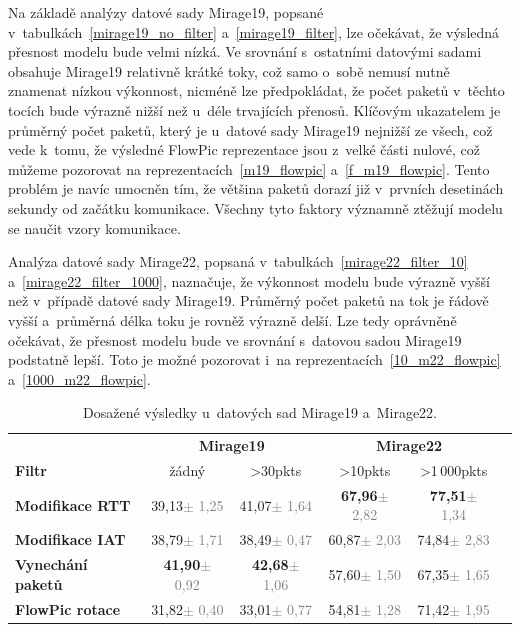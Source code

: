 Na základě analýzy datové sady Mirage19, popsané v~tabulkách~\ref{mirage19_no_filter} a~\ref{mirage19_filter}, lze očekávat, že výsledná přesnost modelu bude velmi nízká. Ve srovnání s~ostatními datovými sadami obsahuje Mirage19 relativně krátké toky, což samo o~sobě nemusí nutně znamenat nízkou výkonnost, nicméně lze předpokládat, že počet paketů v~těchto tocích bude výrazně nižší než u~déle trvajících přenosů. Klíčovým ukazatelem je průměrný počet paketů, který je u~datové sady Mirage19 nejnižší ze všech, což vede k~tomu, že výsledné FlowPic reprezentace jsou z~velké části nulové, což můžeme pozorovat na reprezentacích~\ref{m19_flowpic} a~\ref{f_m19_flowpic}. Tento problém je navíc umocněn tím, že většina paketů dorazí již v~prvních desetinách sekundy od začátku komunikace. Všechny tyto faktory významně ztěžují modelu se naučit vzory komunikace.

Analýza datové sady Mirage22, popsaná v~tabulkách~\ref{mirage22_filter_10} a~\ref{mirage22_filter_1000}, naznačuje, že výkonnost modelu bude výrazně vyšší než v~případě datové sady Mirage19. Průměrný počet paketů na tok je řádově vyšší a~průměrná délka toku je rovněž výrazně delší. Lze tedy oprávněně očekávat, že přesnost modelu bude ve srovnání s~datovou sadou Mirage19 podstatně lepší. Toto je možné pozorovat i~na reprezentacích~\ref{10_m22_flowpic} a~\ref{1000_m22_flowpic}.

\begin{table}[H]
    \centering
        \begin{tabular}{l c c c c c}
            \toprule
              & \multicolumn{2}{c}{\textbf{Mirage19}} & \multicolumn{2}{c}{\textbf{Mirage22}} \\
              \cmidrule(lr){2-3} \cmidrule(lr){4-5}
             \textbf{Filtr} & žádný & >30pkts & >10pkts & >1\,000pkts \\
            \midrule
            \textbf{Modifikace RTT} & 39,13{\tiny\textcolor{gray}{$\pm$ 1,25}} & 41,07{\tiny\textcolor{gray}{$\pm$ 1,64}} & \textbf{67,96}{\tiny\textcolor{gray}    {$\pm$ 2,82}} & \textbf{77,51}{\tiny\textcolor{gray}{$\pm$ 1,34}}\\
            \textbf{Modifikace IAT} & 38,79{\tiny\textcolor{gray}{$\pm$ 1,71}} & 38,49{\tiny\textcolor{gray}{$\pm$ 0,47}} & 60,87{\tiny\textcolor{gray}{$\pm$ 2,03}} & 74,84{\tiny\textcolor{gray}{$\pm$ 2,83}}\\
            \textbf{Vynechání paketů} & \textbf{41,90}{\tiny\textcolor{gray}{$\pm$ 0,92}} & \textbf{42,68}{\tiny\textcolor{gray}{$\pm$ 1,06}} & 57,60{\tiny\textcolor{gray}  {$\pm$ 1,50}} & 67,35{\tiny\textcolor{gray}{$\pm$ 1,65}}\\
            \textbf{FlowPic rotace} & 31,82{\tiny\textcolor{gray}{$\pm$ 0,40}} & 33,01{\tiny\textcolor{gray}{$\pm$ 0,77}} & 54,81{\tiny\textcolor{gray}{$\pm$ 1,28}} & 71,42{\tiny\textcolor{gray}{$\pm$ 1,95}}\\
            \bottomrule
        \end{tabular}
    \caption{Dosažené výsledky u~datových sad Mirage19 a~Mirage22.}
\end{table}

